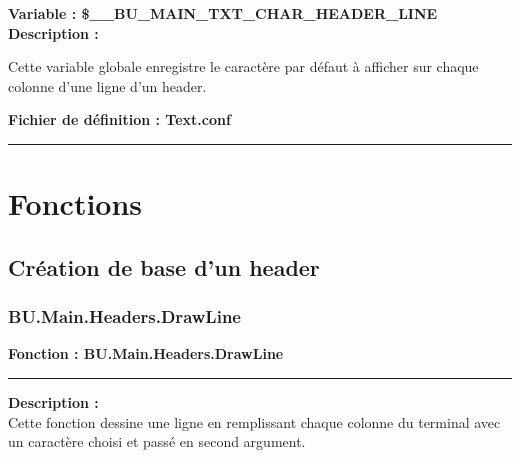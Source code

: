 \documentclass[a4paper,10pt]{article}
\begin{document}
\textbf{Variable : \color{vars}\$\_\_BU\_MAIN\_TXT\_CHAR\_HEADER\_LINE}\\[1\baselineskip]

\textbf{Description :}

\begin{justify}
    Cette variable globale enregistre le caractère par défaut à afficher sur chaque colonne d'une ligne d'un header.
\end{justify}

\textbf{Fichier de définition : \color{path}Text.conf}\\[1\baselineskip]





\color{sec1}\par\noindent\rule{\textwidth}{0.4pt}\color{text}

\color{sec1}
\section{Fonctions}\color{text}

\color{sec2}
\subsection{Création de base d'un header}\color{text}

\color{sec3}
\subsubsection{BU.Main.Headers.DrawLine}\color{text}

\textbf{Fonction : \color{func}BU.Main.Headers.DrawLine}\setlength{\parskip}{1em}


\par\noindent\rule{\textwidth}{0.4pt}

\begin{justify}
    \textbf{Description :}\\[1\baselineskip]
    Cette fonction dessine une ligne en remplissant chaque colonne du terminal avec un caractère choisi et passé en second argument.
\end{justify}
\end{document}
